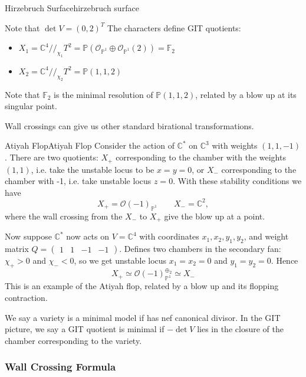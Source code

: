 \begin{example}{Hirzebruch Surface}{hirzebruch surface}
\begin{centering}
\begin{tikzpicture}[x=0.75pt,y=0.75pt,yscale=-1,xscale=1]
\end{tikzpicture}
	
\end{centering}

Note that $\det V=(0,2)^T$
The characters define GIT quotients: 
\begin{itemize}
	\item  $X_{1}= \mathbb{C}^{4}//_{\chi_{1}}T^{2}= \mathbb{P}(\mathcal{O}_{\mathbb{P}^{1}}\oplus \mathcal{O}_{\mathbb{P}^{1}}(2)) = \mathbb{F}_2$
	\item  $X_{2}= \mathbb{C}^{4}//_{\chi_{2}}T^{2}= \mathbb{P}(1,1,2)$
\end{itemize}

Note that $\mathbb{F}_2$ is the minimal resolution of $\mathbb{P}(1,1,2)$, related by a blow up at its singular point.
\end{example}

Wall crossings can give us other standard birational transformations.

\begin{example}{Atiyah Flop}{Atiyah Flop}
Consider the action of $\mathbb{C}^{*}$ on $\mathbb{C}^3$ with weights $(1,1,-1)$. 
There are two quotients: $X_+$ corresponding to the chamber with the weights $(1,1)$, i.e. take the unstable locus to be $x=y= 0$, or $X_-$ corresponding to the chamber with -1, i.e. take unstable locus $z = 0$. With these stability conditions we have $$
X_{+}= \mathcal{O}(-1)_{\mathbb{P}^{1}} \qquad X_{-}= \mathbb{C}^2, $$ where the wall crossing from the $X_-$ to $X_+$ give the blow up at a point. 

Now suppose $\mathbb{C}^*$ now acts on $V = \mathbb{C}^4$  with coordinates $x_{1}, x_{2}, y_{1},y_{2}$, and weight matrix $Q = \begin{pmatrix}1&1&-1&-1\end{pmatrix}$. 
Defines two chambers in the secondary fan: $\chi_{+}>0$ and $\chi_{-}<0$, so we get unstable locus $x_{1}= x_{2}= 0$ and $y_{1}= y_{2}=0$. Hence $$
X_{+}\simeq \mathcal{O}(-1)_{\mathbb{P}^{1}}^{\oplus_{2}}\simeq X_-
$$This is an example of the Atiyah flop, related by a blow up and its flopping contraction. 
\end{example}

We say a variety is a minimal model if has nef canonical divisor. In the GIT picture, we say a GIT quotient is minimal if $-\det V$ lies in the closure of the chamber corresponding to the variety. 

\subsubsection{Wall Crossing Formula}

